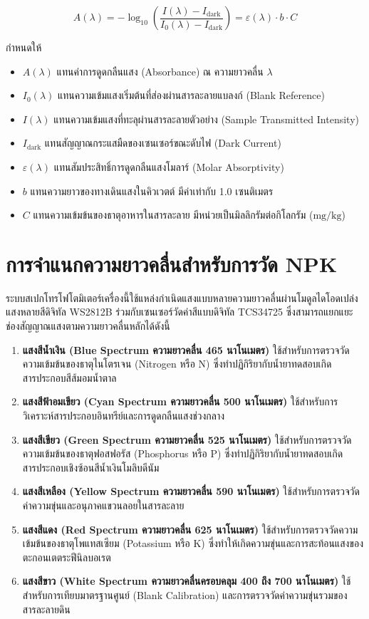 \begin{equation}
    A(\lambda) = -\log_{10}\left(\frac{I(\lambda) - I_{\text{dark}}}{I_0(\lambda) - I_{\text{dark}}}\right) = \varepsilon(\lambda) \cdot b \cdot C
\end{equation}

กำหนดให้
\begin{itemize}[leftmargin=2.0em, itemsep=2pt]
    \item $A(\lambda)$ แทนค่าการดูดกลืนแสง (Absorbance) ณ ความยาวคลื่น $\lambda$
    \item $I_0(\lambda)$ แทนความเข้มแสงเริ่มต้นที่ส่องผ่านสารละลายแบลงก์ (Blank Reference)
    \item $I(\lambda)$ แทนความเข้มแสงที่ทะลุผ่านสารละลายตัวอย่าง (Sample Transmitted Intensity)
    \item $I_{\text{dark}}$ แทนสัญญาณกระแสมืดของเซนเซอร์ขณะดับไฟ (Dark Current)
    \item $\varepsilon(\lambda)$ แทนสัมประสิทธิ์การดูดกลืนแสงโมลาร์ (Molar Absorptivity)
    \item $b$ แทนความยาวของทางเดินแสงในคิวเวตต์ มีค่าเท่ากับ 1.0 เซนติเมตร
    \item $C$ แทนความเข้มข้นของธาตุอาหารในสารละลาย มีหน่วยเป็นมิลลิกรัมต่อกิโลกรัม ($\text{mg/kg}$)
\end{itemize}

\section{การจำแนกความยาวคลื่นสำหรับการวัด NPK}
ระบบสเปกโทรโฟโตมิเตอร์เครื่องนี้ใช้แหล่งกำเนิดแสงแบบหลายความยาวคลื่นผ่านโมดูลไดโอดเปล่งแสงหลายสีดิจิทัล WS2812B ร่วมกับเซนเซอร์วัดค่าสีแบบดิจิทัล TCS34725 ซึ่งสามารถแยกแยะช่องสัญญาณแสงตามความยาวคลื่นหลักได้ดังนี้

\begin{enumerate}[leftmargin=1.5em, itemsep=3pt]
    \item \textbf{แสงสีน้ำเงิน (Blue Spectrum ความยาวคลื่น 465 นาโนเมตร)} ใช้สำหรับการตรวจวัดความเข้มข้นของธาตุไนโตรเจน (Nitrogen หรือ N) ซึ่งทำปฏิกิริยากับน้ำยาทดสอบเกิดสารประกอบสีส้มอมน้ำตาล
    \item \textbf{แสงสีฟ้าอมเขียว (Cyan Spectrum ความยาวคลื่น 500 นาโนเมตร)} ใช้สำหรับการวิเคราะห์สารประกอบอินทรีย์และการดูดกลืนแสงช่วงกลาง
    \item \textbf{แสงสีเขียว (Green Spectrum ความยาวคลื่น 525 นาโนเมตร)} ใช้สำหรับการตรวจวัดความเข้มข้นของธาตุฟอสฟอรัส (Phosphorus หรือ P) ซึ่งทำปฏิกิริยากับน้ำยาทดสอบเกิดสารประกอบเชิงซ้อนสีน้ำเงินโมลิบดีนัม
    \item \textbf{แสงสีเหลือง (Yellow Spectrum ความยาวคลื่น 590 นาโนเมตร)} ใช้สำหรับการตรวจวัดค่าความขุ่นและอนุภาคแขวนลอยในสารละลาย
    \item \textbf{แสงสีแดง (Red Spectrum ความยาวคลื่น 625 นาโนเมตร)} ใช้สำหรับการตรวจวัดความเข้มข้นของธาตุโพแทสเซียม (Potassium หรือ K) ซึ่งทำให้เกิดความขุ่นและการสะท้อนแสงของตะกอนเตตระฟีนิลบอเรต
    \item \textbf{แสงสีขาว (White Spectrum ความยาวคลื่นครอบคลุม 400 ถึง 700 นาโนเมตร)} ใช้สำหรับการเทียบมาตรฐานศูนย์ (Blank Calibration) และการตรวจวัดค่าความขุ่นรวมของสารละลายดิน
\end{enumerate}

